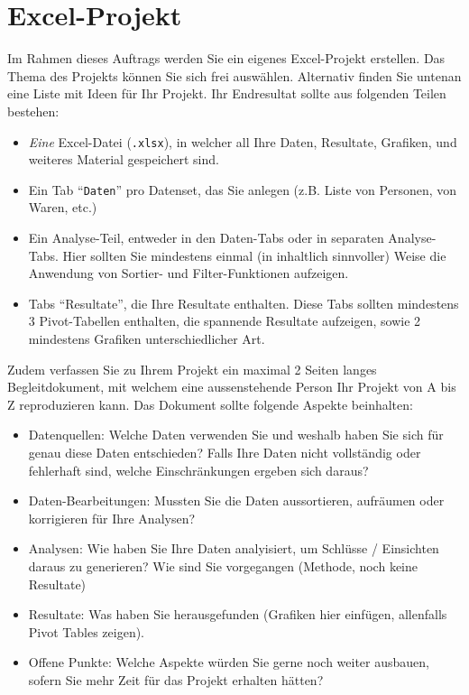 \section*{ Excel-Projekt}

Im Rahmen dieses Auftrags werden Sie ein eigenes Excel-Projekt erstellen. Das Thema des Projekts können Sie sich frei auswählen. Alternativ finden Sie untenan eine Liste mit Ideen für Ihr Projekt. Ihr Endresultat sollte aus folgenden Teilen bestehen:

\begin{itemize}
	\item \textit{Eine} Excel-Datei (\texttt{.xlsx}), in welcher all Ihre Daten, Resultate, Grafiken, und weiteres Material gespeichert sind.
	\item Ein Tab ``\texttt{Daten}'' pro Datenset, das Sie anlegen (z.B. Liste von Personen, von Waren, etc.)
	\item Ein Analyse-Teil, entweder in den Daten-Tabs oder in separaten Analyse-Tabs. Hier sollten Sie mindestens einmal (in inhaltlich sinnvoller) Weise die Anwendung von Sortier- und Filter-Funktionen aufzeigen.
	\item Tabs ``Resultate'', die Ihre Resultate enthalten. Diese Tabs sollten mindestens 3 Pivot-Tabellen enthalten, die spannende Resultate aufzeigen, sowie 2 mindestens Grafiken unterschiedlicher Art.
\end{itemize}

Zudem verfassen Sie zu Ihrem Projekt ein maximal 2 Seiten langes Begleitdokument, mit welchem eine aussenstehende Person Ihr Projekt von A bis Z reproduzieren kann. Das  Dokument sollte folgende Aspekte beinhalten:
\begin{itemize}
	\item Datenquellen: Welche Daten verwenden Sie und weshalb haben Sie sich für genau diese Daten entschieden? Falls Ihre Daten nicht vollständig oder fehlerhaft sind, welche Einschränkungen ergeben sich daraus?
	\item Daten-Bearbeitungen: Mussten Sie die Daten aussortieren, aufräumen oder korrigieren für Ihre Analysen?
	\item Analysen: Wie haben Sie Ihre Daten analyisiert, um Schlüsse / Einsichten daraus zu generieren? Wie sind Sie vorgegangen (Methode, noch keine Resultate)
	\item Resultate: Was haben Sie herausgefunden (Grafiken hier einfügen, allenfalls Pivot Tables zeigen).
	\item Offene Punkte: Welche Aspekte würden Sie gerne noch weiter ausbauen, sofern Sie mehr Zeit für das Projekt erhalten hätten?
\end{itemize}

